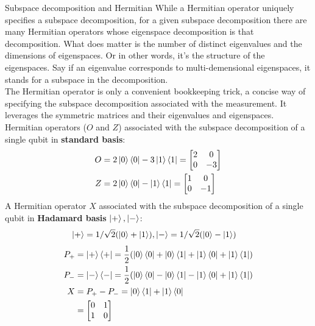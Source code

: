\documentclass{beamer}
\begin{document}
\begin{frame}{Subspace decomposition and Hermitian}
  {\tiny
    While a Hermitian operator uniquely specifies a subspace decomposition,
    for a given subspace decomposition there are many Hermitian operators whose eigenspace decomposition is that decomposition.
    What does matter is the number of distinct eigenvalues and the dimensions of eigenspaces.
    Or in other words, it's the structure of the eigenspaces.
    Say if an eigenvalue corresponds to multi-demensional eigenspaces, it stands for a subspace in the decomposition. \\
    The Hermitian operator is only a convenient bookkeeping trick, a concise way of specifying the subspace decomposition associated with the measurement.
    It leverages the symmetric matrices and their eigenvalues and eigenspaces. \\
    Hermitian operators ($O$ and $Z$) associated with the subspace decomposition of a single qubit in \textbf{standard basis}:
    \begin{align*}
      O &= 2 \ket0 \bra0 - 3 \ket1 \bra1
        = \begin{bmatrix}
             2 & 0 \\
             0 & -3
           \end{bmatrix} \\
      Z &= 2 \ket0 \bra0 - \ket1 \bra1
        = \begin{bmatrix}
             1 & 0 \\
             0 & -1
           \end{bmatrix}
    \end{align*}
    A Hermitian operator $X$ associated with the subspace decomposition of a single qubit in \textbf{Hadamard basis} {$\ket+, \ket-$}:
    \begin{align*}
      \ket+ = 1/\sqrt2 ( \ket0 + \ket1), & \ket- = 1/\sqrt2 ( \ket0 - \ket1)
    \end{align*}
    \begin{align*}
      P_+ &= \ket+ \bra+ = \frac{1}{2} ( \ket0\bra0 + \ket0\bra1 + \ket1\bra0 + \ket1\bra1 ) \\
      P_- &= \ket- \bra- = \frac{1}{2} ( \ket0\bra0 - \ket0\bra1 - \ket1\bra0 + \ket1\bra1 ) \\
      X &= P_+ - P_- = \ket0\bra1 + \ket1\bra0 \\
      &= \begin{bmatrix}
        0 & 1 \\
        1 & 0
      \end{bmatrix}
    \end{align*}
  }%
\end{frame}
\end{document}
